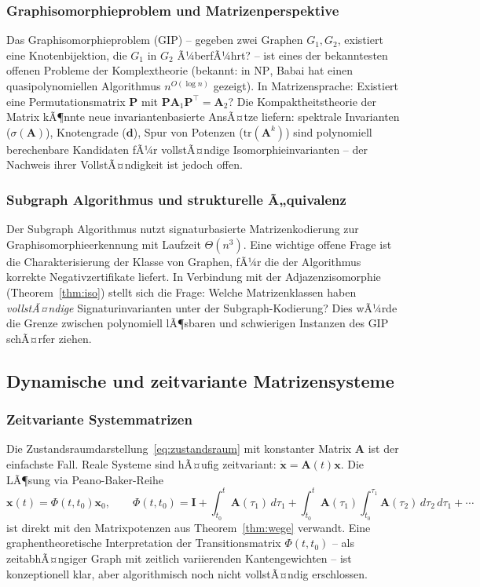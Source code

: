 ﻿\documentclass[12pt, a4paper]{article}
\theoremstyle{definition}
\theoremstyle{remark}
\newcommand{\vx}{\bm{x}}
\newcommand{\vA}{\bm{A}}
\newcommand{\vP}{\bm{P}}
\newcommand{\vI}{\bm{I}}
\newcommand{\T}{\top}
\newcommand{\tr}{\mathrm{tr}}
\newcommand{\spec}{\sigma}
\begin{document}
\subsubsection*{Graphisomorphieproblem und Matrizenperspektive}

Das Graphisomorphieproblem (GIP) -- gegeben zwei Graphen $G_1, G_2$,
existiert eine Knotenbijektion, die $G_1$ in $G_2$ Ã¼berfÃ¼hrt? -- ist
eines der bekanntesten offenen Probleme der Komplextheorie (bekannt: in
$\mathrm{NP}$, Babai \citep{babai2016} hat einen quasipolynomiellen
Algorithmus $n^{O(\log n)}$ gezeigt). In Matrizensprache: Existiert
eine Permutationsmatrix $\vP$ mit $\vP \vA_1 \vP^\T = \vA_2$?
Die Kompaktheitstheorie der Matrix kÃ¶nnte neue invariantenbasierte
AnsÃ¤tze liefern: spektrale Invarianten ($\spec(\vA)$), Knotengrade
($\bm{d}$), Spur von Potenzen ($\tr(\vA^k)$) sind polynomiell
berechenbare Kandidaten fÃ¼r vollstÃ¤ndige Isomorphieinvarianten --
der Nachweis ihrer VollstÃ¤ndigkeit ist jedoch offen.

\subsubsection*{Subgraph Algorithmus und strukturelle Ã„quivalenz}

Der Subgraph Algorithmus \citep{epp2026subgraph} nutzt signaturbasierte
Matrizenkodierung zur Graphisomorphieerkennung mit Laufzeit
$\Theta(n^3)$. Eine wichtige offene Frage ist die Charakterisierung
der Klasse von Graphen, fÃ¼r die der Algorithmus korrekte
Negativzertifikate liefert. In Verbindung mit der Adjazenzisomorphie
(Theorem~\ref{thm:iso}) stellt sich die Frage: Welche Matrizenklassen
haben \emph{vollstÃ¤ndige} Signaturinvarianten unter der Subgraph-Kodierung?
Dies wÃ¼rde die Grenze zwischen polynomiell lÃ¶sbaren und schwierigen
Instanzen des GIP schÃ¤rfer ziehen.

\subsection{Dynamische und zeitvariante Matrizensysteme}
\label{subsec:dynamisch}

\subsubsection*{Zeitvariante Systemmatrizen}

Die Zustandsraumdarstellung~\eqref{eq:zustandsraum} mit konstanter Matrix
$\vA$ ist der einfachste Fall. Reale Systeme sind hÃ¤ufig zeitvariant:
$\dot{\vx} = \vA(t)\vx$. Die LÃ¶sung via Peano-Baker-Reihe
\[
  \vx(t) = \Phi(t, t_0)\vx_0, \qquad
  \Phi(t,t_0) = \vI + \int_{t_0}^t \vA(\tau_1)\,d\tau_1
    + \int_{t_0}^t \vA(\tau_1)\int_{t_0}^{\tau_1}\vA(\tau_2)\,d\tau_2\,d\tau_1 + \cdots
\]
ist direkt mit den Matrixpotenzen aus Theorem~\ref{thm:wege} verwandt.
Eine graphentheoretische Interpretation der Transitionsmatrix
$\Phi(t,t_0)$ -- als zeitabhÃ¤ngiger Graph mit zeitlich variierenden
Kantengewichten -- ist konzeptionell klar, aber algorithmisch noch
nicht vollstÃ¤ndig erschlossen.
\end{document}
